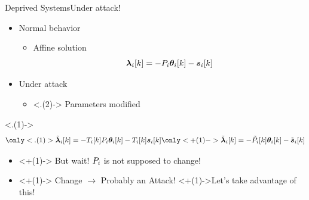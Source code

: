 \documentclass[aspectratio=169]{beamer}
\begin{document}
\begin{frame}{Deprived Systems}{Under attack!}
  \begin{minipage}[t]{.45\linewidth}
    \begin{itemize}[<+->]
      \item Normal behavior
            \begin{itemize}
              \item Affine solution
                    \begin{equation*}
                      \lambdaik=-\Plin\thetaik-\sik
                    \end{equation*}
            \end{itemize}
    \end{itemize}
  \end{minipage}
  \hfill
  \begin{minipage}[t]{.45\linewidth}
    \begin{itemize}
      \item<+-> Under attack \onslide<+->{$\to$ $\lambdaicheat=\Tik\lambdai$}
            \begin{itemize}
              \item<.(2)-> Parameters modified
            \end{itemize}
    \end{itemize}
    \only<.(1)->{
      \begin{equation*}
        \only<.(1)>{\lambdaicheat[k]=-\Tik\Plin\thetaik-\Tik\sik}
        \only<+(1)->{\lambdaicheat[k]=-\Plintilde\thetaik-\siktilde}
      \end{equation*}
    }
  \end{minipage}
  \centering
  \begin{itemize}
    \item<+(1)-> But wait! ${P}_{i}$ is not supposed to change!
    \item<+(1)-> Change $\to$ Probably an Attack! \onslide<+(1)->{Let's take advantage of this!}
  \end{itemize}
\end{frame}
\end{document}
